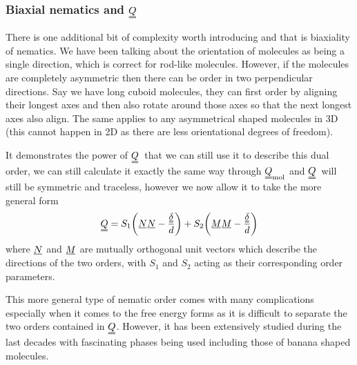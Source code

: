 \documentclass[12pt]{article}
\newcommand{\suf}[2]{\stackunder[0.5pt]{\stackunder[1pt]{\ensuremath{#1}}{\rule{\widthof{\ensuremath{#2}}*\real{0.9}}{.1ex}}}{}}
\newcommand{\duf}[2]{\stackunder[0.5pt]{\stackunder[0.8pt]{\stackunder[1pt]{\ensuremath{#1}}{\rule{\widthof{\ensuremath{#2}}*\real{0.9}}{.1ex}}}{\rule{\widthof{\ensuremath{#2}}*\real{0.9}}{.1ex}}}{}}
\newcommand{\su}[1]{\suf{#1}{#1}}
\newcommand{\du}[1]{\duf{#1}{#1}}
\newcommand{\QQ}{\ensuremath{\du{Q}}}
\newcommand{\dudelta}{\ensuremath{\du{\delta}}}
\begin{document}
        \subsubsection{Biaxial nematics and \QQ}\label{sec:Q_biax}
        There is one additional bit of complexity worth introducing and that is biaxiality of nematics.
        We have been talking about the orientation of molecules as being a single direction, which is correct for rod-like molecules.
        However, if the molecules are completely asymmetric then there can be order in two perpendicular directions.
        Say we have long cuboid molecules, they can first order by aligning their longest axes and then also rotate around those axes so that the next longest axes also align.
        The same applies to any asymmetrical shaped molecules in 3D (this cannot happen in 2D as there are less orientational degrees of freedom).

        It demonstrates the power of \QQ\ that we can still use it to describe this dual order, we can still calculate it exactly the same way through $\du{Q}_\text{mol}$ and \QQ\ will still be symmetric and traceless, however we now allow it to take the more general form
        \begin{equation}\label{eq:Qbiax}
            \du{Q} = S_1\qty(\su{N} \su{N} - \frac{\dudelta}{d}) + S_2\qty(\su{M} \su{M} - \frac{\dudelta}{d})
        \end{equation}
        where $\su{N}$ and $\su{M}$ are mutually orthogonal unit vectors which describe the directions of the two orders, with $S_1$ and $S_2$ acting as their corresponding order parameters.

        This more general type of nematic order comes with many complications especially when it comes to the free energy forms as it is difficult to separate the two orders contained in \QQ.
        However, it has been extensively studied during the last decades with fascinating phases being used including those of banana shaped molecules\cite{luckhurstBiaxialNematicLiquid2015,kumarBiaxialityNematicSmectic2017,kimCurvaturesSmecticLiquid2018}.

\end{document}
